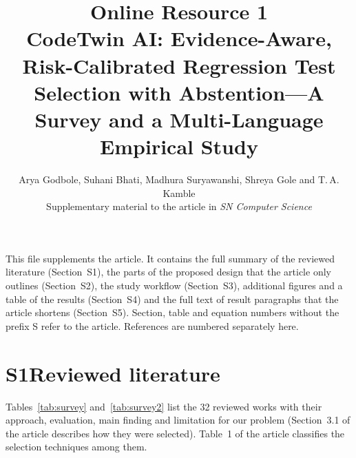 \documentclass[11pt]{article}
\title{Online Resource 1\\[4pt]\large CodeTwin AI: Evidence-Aware, Risk-Calibrated Regression Test Selection with Abstention---A Survey and a Multi-Language Empirical Study}
\author{Arya Godbole, Suhani Bhati, Madhura Suryawanshi, Shreya Gole and T.\,A. Kamble\\\small Supplementary material to the article in \emph{SN Computer Science}}
\date{}
\begin{document}
\maketitle

This file supplements the article. It contains the full summary of the reviewed literature (Section~S1), the parts of the proposed design that the article only outlines (Section~S2), the study workflow (Section~S3), additional figures and a table of the results (Section~S4) and the full text of result paragraphs that the article shortens (Section~S5). Section, table and equation numbers without the prefix S refer to the article. References are numbered separately here.

\section*{S1\quad Reviewed literature}
Tables~\ref{tab:survey} and~\ref{tab:survey2} list the 32 reviewed works with their approach, evaluation, main finding and limitation for our problem (Section~3.1 of the article describes how they were selected). Table~1 of the article classifies the selection techniques among them.
\end{document}
